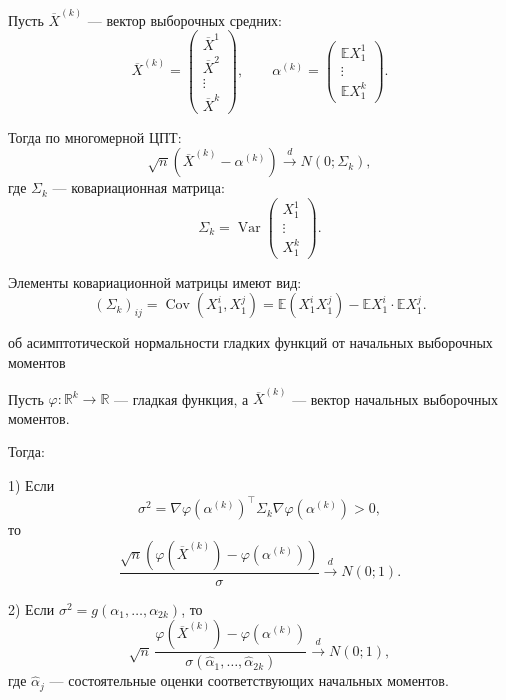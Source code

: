 \documentclass[12pt,a4paper]{article}
\begin{document}
Пусть $\overline{X}^{(k)}$ — вектор выборочных средних:
\[
\overline{X}^{(k)} =
\begin{pmatrix}
\overline{X}^{1}\\
\overline{X}^{2}\\
\vdots\\
\overline{X}^{k}
\end{pmatrix},
\qquad
\alpha^{(k)} =
\begin{pmatrix}
\mathbb{E}X_1^1\\
\vdots\\
\mathbb{E}X_1^k
\end{pmatrix}.
\]

Тогда по многомерной ЦПТ:
\[
\sqrt{n}\left(\overline{X}^{(k)}-\alpha^{(k)}\right)
\xrightarrow{d} N(0;\Sigma_k),
\]
где $\Sigma_k$ — ковариационная матрица:
\[
\Sigma_k =
\operatorname{Var}
\begin{pmatrix}
X_1^1\\
\vdots\\
X_1^k
\end{pmatrix}.
\]

Элементы ковариационной матрицы имеют вид:
\[
(\Sigma_k)_{ij}
=
\operatorname{Cov}(X_1^i,X_1^j)
=
\mathbb{E}(X_1^iX_1^j)
-
\mathbb{E}X_1^i\cdot\mathbb{E}X_1^j.
\]

\begin{theorem}{об асимптотической нормальности гладких функций от начальных выборочных моментов}

Пусть $\varphi:\mathbb{R}^k\to\mathbb{R}$ — гладкая функция, а $\overline{X}^{(k)}$ — вектор начальных выборочных моментов.

Тогда:

1) Если
\[
\sigma^2
=
\nabla\varphi(\alpha^{(k)})^\top
\Sigma_k
\nabla\varphi(\alpha^{(k)})>0,
\]
то
\[
\frac{
\sqrt{n}\left(
\varphi(\overline{X}^{(k)})
-
\varphi(\alpha^{(k)})
\right)
}{\sigma}
\xrightarrow{d}N(0;1).
\]

2) Если $\sigma^2=g(\alpha_1,\ldots,\alpha_{2k})$, то
\[
\sqrt{n}\,
\frac{
\varphi(\overline{X}^{(k)})
-
\varphi(\alpha^{(k)})
}{
\sigma(\widehat{\alpha}_1,\ldots,\widehat{\alpha}_{2k})
}
\xrightarrow{d}N(0;1),
\]
где $\widehat{\alpha}_j$ — состоятельные оценки соответствующих начальных моментов.

\end{theorem}
\end{document}
